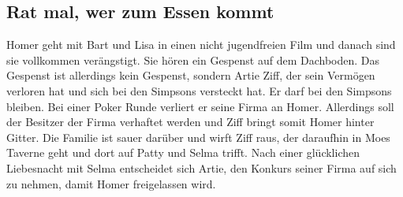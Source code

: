 \subsection{Rat mal, wer zum Essen kommt}\label{FABF08}
Homer geht mit Bart und Lisa in einen nicht jugendfreien Film und danach sind sie vollkommen verängstigt. Sie hören ein Gespenst auf dem Dachboden. Das Gespenst ist allerdings kein Gespenst, sondern Artie Ziff, der sein Vermögen verloren hat und sich bei den Simpsons versteckt hat. Er darf bei den Simpsons bleiben. Bei einer Poker Runde verliert er seine Firma an Homer. Allerdings soll der Besitzer der Firma verhaftet werden und Ziff bringt somit Homer hinter Gitter. Die Familie ist sauer darüber und wirft Ziff raus, der daraufhin in Moes Taverne geht und dort auf Patty und Selma trifft. Nach einer glücklichen Liebesnacht mit Selma entscheidet sich Artie, den Konkurs seiner Firma auf sich zu nehmen, damit Homer freigelassen wird.


